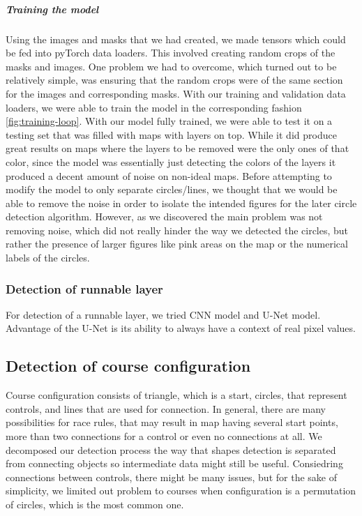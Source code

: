 \documentclass[a4paper,12pt]{extarticle}
\begin{document}
\subparagraph{Training the model\\}
Using the images and masks that we had created, we made tensors which could be fed into pyTorch data loaders. This involved creating random crops of the masks and images. One problem we had to overcome, which turned out to be relatively simple, was ensuring that the random crops were of the same section for the images and corresponding masks. With our training and validation data loaders, we were able to train the model in the corresponding fashion \ref{fig:training-loop}. With our model fully trained, we were able to test it on a testing set that was filled with maps with layers on top. While it did produce great results on maps where the layers to be removed were the only ones of that color, since the model was essentially just detecting the colors of the layers it produced a decent amount of noise on non-ideal maps. Before attempting to modify the model to only separate circles/lines, we thought that we would be able to remove the noise in order to isolate the intended figures for the later circle detection algorithm. However, as we discovered the main problem was not removing noise, which did not really hinder the way we detected the circles, but rather the presence of larger figures like pink areas on the map or the numerical labels of the circles. 

\subsubsection{Detection of runnable layer}

For detection of a runnable layer, we tried CNN model and U-Net model.
Advantage of the U-Net is its ability to always have a context of real pixel values.

\subsection{Detection of course configuration}

Course configuration consists of triangle, which is a start, circles, that represent controls, and lines that are used for connection.
In general, there are many possibilities for race rules, that may result in map having several start points, more than two connections for a control or even no connections at all.
We decomposed our detection process the way that shapes detection is separated from connecting objects so intermediate data might still be useful.
Consiedring connections between controls, there might be many issues, but for the sake of simplicity, we limited out problem to courses when  configuration is a permutation of circles, which is the most common one.
\end{document}
